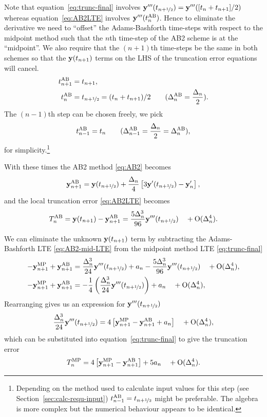 Note that equation~\eqref{eq:trunc-final} involves $\yvhf['''] = \yv'''([t_n +t_{n+1}]/2)$ whereas equation~\eqref{eq:AB2LTE} involves $\yv'''(t_n^\AB)$.
Hence to eliminate the derivative we need to ``offset'' the Adams-Bashforth time-steps with respect to the midpoint method such that the $n$th time-step of the AB2 scheme is at the ``midpoint''.
We also require that the $(n+1)$th time-steps be the same in both schemes so that the $\yv(t_{n+1})$ terms on the LHS of the truncation error equations will cancel.
\begin{align}
  t_{n+1}^\AB &= t_{n+1}, \notag\\
  t_n^\AB &= \thf = (t_{n} + t_{n+1})/2  \qquad   (\dtn^\AB = \frac{\dtn}{2}).
  \label{eq:ab2-ts}
\end{align}
The $(n-1)$th step can be chosen freely, we pick
\begin{equation}
  t_{n-1}^\AB = t_n  \qquad   (\dtx{n-1}^\AB = \frac{\dtn}{2} = \dtn^\AB),
\end{equation}
for simplicity.\footnote{Depending on the method used to calculate input values for this step (see Section~\ref{sec:calc-requ-input}) $t_{n-1}^\AB = \thf$ might be preferable. The algebra is more complex but the numerical behaviour appears to be identical.}

With these times the AB2 method \eqref{eq:AB2} becomes
\begin{equation}
   \yv_{n+1}^{\AB} = \yvhf + \frac{\dtn}{4} \left[
     3 \yvhf['] - \yv_n' \right],
   \label{eq:AB2-mid}
\end{equation}
and the local truncation error \eqref{eq:AB2LTE} becomes
\begin{equation}
  \lte^\AB = \yv(t_{n+1}) -  \yv_{n+1}^{\AB}
  = \frac{5 \dtn^3}{96} \yvhf['''] \porder{\dtn^4}.
\label{eq:AB2-mid-LTE}
\end{equation}

We can eliminate the unknown $\yv(t_{n+1})$ term by subtracting the Adams-Bashforth LTE \eqref{eq:AB2-mid-LTE} from the midpoint method LTE \eqref{eq:trunc-final}
\begin{align}
 - \yv_{n+1}^{\IMP} + \yv_{n+1}^{\AB} &=
   \frac{\dtn^3}{24} \yvhf['''] + \ymiderr
  - \frac{5\dtn^3}{96} \yvhf[''']
  \porder{\dtn^4}, \notag \\
  - \yv_{n+1}^{\IMP} + \yv_{n+1}^{\AB} &= -\frac{1}{4} \left( \frac{\dtn^3}{24} \yvhf['''] \right)
  + \ymiderr
  \porder{\dtn^4},
\end{align}
Rearranging gives us an expression for $\yvhf[''']$
\begin{equation}
  \frac{\dtn^3}{24} \yvhf['''] = 4 \left[ \yv_{n+1}^\IMP - \yv_{n+1}^{\AB} + a_n \right]  \porder{\dtn^4},
\end{equation}
which can be substituted into equation~\eqref{eq:trunc-final} to give the truncation error
\begin{equation}
  \lte^\IMP = 4 \left[ \yv_{n+1}^\IMP - \yv_{n+1}^{\AB} \right] + 5 a_n
  \porder{\dtn^4}.
  \label{eq:50}
\end{equation}


